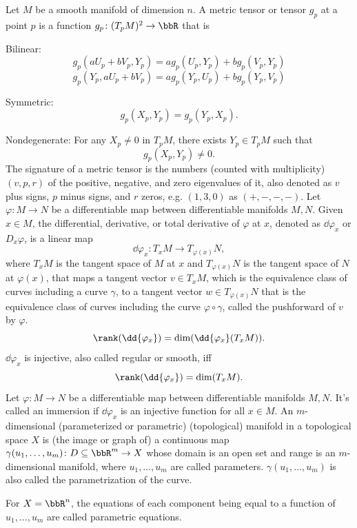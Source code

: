 Let $M$ be a smooth manifold of dimension $n$. A metric tensor or tensor $g_p$ at a point $p$ is a function $g_p\colon (T_pM)^2\to\bbR$ that is
\bit
\item Bilinear:
\[g_p(aU_p+bV_p,Y_p)=ag_p(U_p,Y_p)+bg_p(V_p,Y_p)\]
\[g_p(Y_p,aU_p+bV_p)=ag_p(Y_p,U_p)+bg_p(Y_p,V_p)\]
\item Symmetric:
\[g_p(X_p,Y_p)=g_p(Y_p,X_p).\]
\item Nondegenerate: For any $X_p\ne0$ in $T_pM$, there exists $Y_p\in T_pM$ such that
\[g_p(X_p,Y_p)\ne0.\]
\eit
{}
The signature of a metric tensor is the numbers (counted with multiplicity) $(v,p,r)$ of the positive, negative, and zero eigenvalues of it, also denoted as $v$ plus signs, $p$ minus signs, and $r$ zeros, e.g. $(1,3,0)$ as $(+,-,-,-)$.
Let $\varphi\colon M\to N$ be a differentiable map between differentiable manifolds $M,N$.
Given $x\in M$, the differential, derivative, or total derivative of $\varphi$ at $x$, denoted as $\dd{\varphi_x}$ or $D_x\varphi$, is a linear map
\[\dd{\varphi_x}\colon T_xM\to T_{\varphi(x)}N,\]
where $T_xM$ is the tangent space of $M$ at $x$ and $T_{\varphi(x)}N$ is the tangent space of $N$ at $\varphi(x)$, that maps a tangent vector $v\in T_xM$, which is the equivalence class of curves including a curve $\gamma$, to a tangent vector $w\in T_{\varphi(x)}N$ that is the equivalence class of curves including the curve $\varphi\circ\gamma$, called the pushforward of $v$ by $\varphi$.
\[\rank(\dd{\varphi_x})=\dim(\dd{\varphi_x}(T_xM)).\]
$\dd{\varphi_x}$ is injective, also called regular or smooth, iff
\[\rank(\dd{\varphi_x})=\dim(T_xM).\]
Let $\varphi\colon M\to N$ be a differentiable map between differentiable manifolds $M,N$. It's called an immersion if $\dd{\varphi_x}$ is an injective function for all $x\in M$.
An $m$-dimensional (parameterized or parametric) (topological) manifold in a topological space $X$ is (the image or graph of) a continuous map $\gamma(u_1,\ldots,u_m)\colon D\subseteq\bbR^m\to X$ whose domain is an open set and range is an $m$-dimensional manifold, where $u_1,\ldots,u_m$ are called parameters. $\gamma(u_1,\ldots,u_m)$ is also called the parametrization of the curve.

For $X=\bbR^n$, the equations of each component being equal to a function of $u_1,\ldots,u_m$ are called parametric equations.

